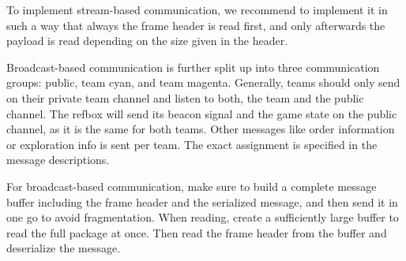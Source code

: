\documentclass[a4paper]{article}
\begin{document}
To implement stream-based communication, we recommend to implement it
in such a way that always the frame header is read first, and only
afterwards the payload is read depending on the size given in the
header.

Broadcast-based communication is further split up into three
communication groups: public, team cyan, and team magenta. Generally,
teams should only send on their private team channel and listen to
both, the team and the public channel. The refbox will send its beacon
signal and the game state on the public channel, as it is the same for
both teams. Other messages like order information or exploration info
is sent per team. The exact assignment is specified in the message
descriptions.

For broadcast-based communication, make sure to build a complete
message buffer including the frame header and the serialized message,
and then send it in one go to avoid fragmentation. When reading,
create a sufficiently large buffer to read the full package at
once. Then read the frame header from the buffer and deserialize the
message.
\end{document}
